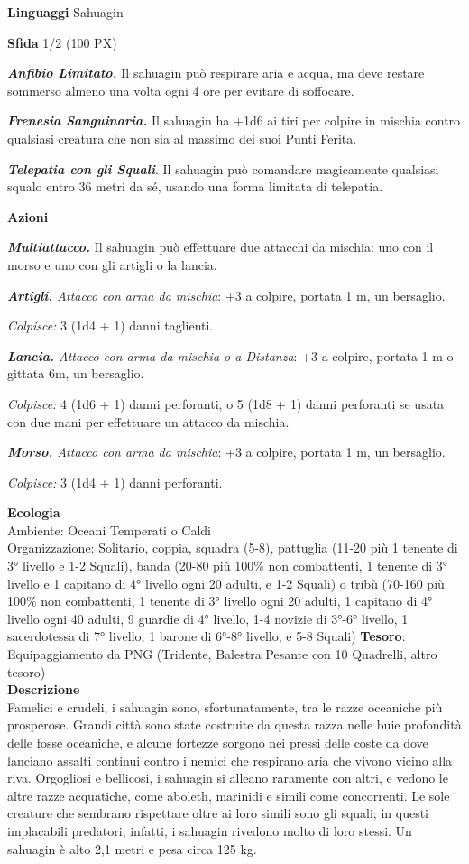 \begin{multicols}{2}
	\textbf{Linguaggi} Sahuagin

	\textbf{Sfida} 1/2 (100 PX)

	\textit{\textbf{Anfibio Limitato.}} Il sahuagin può respirare aria e acqua, ma deve restare sommerso almeno una volta ogni 4 ore per evitare di soffocare.

	\textit{\textbf{Frenesia Sanguinaria.}} Il sahuagin ha +1d6 ai tiri per colpire in mischia contro qualsiasi creatura che non sia al massimo dei suoi Punti Ferita.

	\textit{\textbf{Telepatia con gli Squali}}. Il sahuagin può comandare magicamente qualsiasi squalo entro 36 metri da sé, usando una forma limitata di telepatia.

	\textbf{Azioni}

	\textit{\textbf{Multiattacco.}} Il sahuagin può effettuare due attacchi da mischia: uno con il morso e uno con gli artigli o la lancia.

	\textit{\textbf{Artigli.} Attacco con arma da mischia}: +3 a colpire, portata 1 m, un bersaglio.

	\textit{Colpisce:} 3 (1d4 + 1) danni taglienti.

	\textit{\textbf{Lancia.} Attacco con arma da mischia o a Distanza}: +3 a colpire, portata 1 m o gittata 6m, un bersaglio.

	\textit{Colpisce:} 4 (1d6 + 1) danni perforanti, o 5 (1d8 + 1) danni perforanti se usata con due mani per effettuare un attacco da mischia.

	\textit{\textbf{Morso.} Attacco con arma da mischia}: +3 a colpire, portata 1 m, un bersaglio.

	\textit{Colpisce:} 3 (1d4 + 1) danni perforanti.

	\textbf{Ecologia}\\
	Ambiente: Oceani Temperati o Caldi\\
	Organizzazione: Solitario, coppia, squadra (5-8), pattuglia (11-20 più 1 tenente di 3° livello e 1-2 Squali), banda (20-80 più 100\% non combattenti, 1 tenente di 3° livello e 1 capitano di 4° livello ogni 20 adulti, e 1-2 Squali) o tribù (70-160 più 100\% non combattenti, 1 tenente di 3° livello ogni 20 adulti, 1 capitano di 4° livello ogni 40 adulti, 9 guardie di 4° livello, 1-4 novizie di 3°-6° livello, 1 sacerdotessa di 7° livello, 1 barone di 6°-8° livello, e 5-8 Squali)
	\textbf{Tesoro}: Equipaggiamento da PNG (Tridente, Balestra Pesante con 10 Quadrelli, altro tesoro)\\
	\textbf{Descrizione}\\
	Famelici e crudeli, i sahuagin sono, sfortunatamente, tra le razze oceaniche più prosperose. Grandi città sono state costruite da questa razza nelle buie profondità delle fosse oceaniche, e alcune fortezze sorgono nei pressi delle coste da dove lanciano assalti continui contro i nemici che respirano aria che vivono vicino alla riva. Orgogliosi e bellicosi, i sahuagin si alleano raramente con altri, e vedono le altre razze acquatiche, come aboleth, marinidi e simili come concorrenti. Le sole creature che sembrano rispettare oltre ai loro simili sono gli squali; in questi implacabili predatori, infatti, i sahuagin rivedono molto di loro stessi. Un sahuagin è alto 2,1 metri e pesa circa 125 kg.


\end{multicols}
